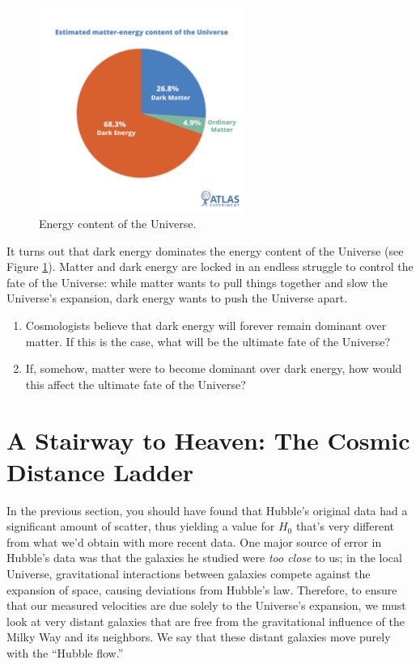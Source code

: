 \documentclass[11pt]{article}
\begin{document}
\begin{figure}[h!]
    \centering
    \includegraphics[width=0.6\textwidth]{Images/dark energy.png}
    \caption{Energy content of the Universe.}
    \label{fig:energy}
\end{figure}
\medskip \noindent
It turns out that dark energy dominates the energy content of the Universe (see Figure \ref{fig:energy}). Matter and dark energy are locked in an endless struggle to control the fate of the Universe: while matter wants to pull things together and slow the Universe's expansion, dark energy wants to push the Universe apart.
\begin{enumerate}[resume]
    \item Cosmologists believe that dark energy will forever remain dominant over matter. If this is the case, what will be the ultimate fate of the Universe?
    
    \item If, somehow, matter were to become dominant over dark energy, how would this affect the ultimate fate of the Universe?
\end{enumerate}


\section{A Stairway to Heaven: The Cosmic Distance Ladder}

In the previous section, you should have found that Hubble's original data had a significant amount of scatter, thus yielding a value for $H_0$ that's very different from what we'd obtain with more recent data. One major source of error in Hubble's data was that the galaxies he studied were \emph{too close} to us; in the local Universe, gravitational interactions between galaxies compete against the expansion of space, causing deviations from Hubble's law. Therefore, to ensure that our measured velocities are due solely to the Universe's expansion, we must look at very distant galaxies that are free from the gravitational influence of the Milky Way and its neighbors. We say that these distant galaxies move purely with the ``Hubble flow.''
\end{document}
